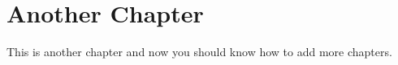 \chapter{Another Chapter}\label{Ch:another_chapter}

This is another chapter and now you should know how to add more chapters.

\endinput